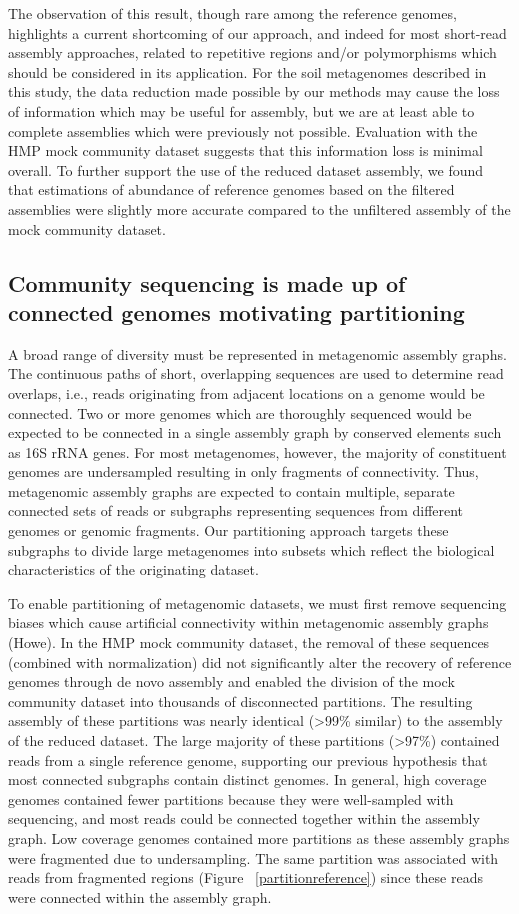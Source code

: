 \documentclass[11pt]{article} %
\begin{document}
The observation of this result, though rare among the reference genomes, highlights a current shortcoming of our approach, and indeed for most short-read assembly approaches, related to repetitive regions and/or polymorphisms which should be considered in its application.  For the soil metagenomes described in this study, the data reduction made possible by our methods may cause the loss of information which may be useful for assembly, but we are at least able to complete assemblies which were previously not possible.  Evaluation with the HMP mock community dataset suggests that this information loss is minimal overall.  To further support the use of the reduced dataset assembly, we found that estimations of abundance of reference genomes based on the filtered assemblies were slightly more accurate compared to the unfiltered assembly of the mock community dataset.

\subsection{Community sequencing is made up of connected genomes motivating partitioning}

A broad range of diversity must be represented in metagenomic assembly graphs. The continuous paths of short, overlapping sequences are used to determine read overlaps, i.e., reads originating from adjacent locations on a genome would be connected.   Two or more genomes which are thoroughly sequenced would be expected to be connected in a single assembly graph by conserved elements such as 16S rRNA genes.  For most metagenomes, however, the majority of constituent genomes are undersampled resulting in only fragments of connectivity.  Thus, metagenomic assembly graphs are expected to contain multiple, separate connected sets of reads or subgraphs representing sequences from different genomes or genomic fragments.  Our partitioning approach targets these subgraphs to divide large metagenomes into subsets which reflect the biological characteristics of the originating dataset.  

To enable partitioning of metagenomic datasets, we must first remove sequencing biases which cause artificial connectivity within metagenomic assembly graphs (Howe).  In the HMP mock community dataset, the removal of these sequences (combined with normalization) did not significantly alter the recovery of reference genomes through de novo assembly and enabled the division of the mock community dataset into thousands of disconnected partitions.  The resulting assembly of these partitions was nearly identical (>99\% similar) to the assembly of the reduced dataset.  The large majority of these partitions (>97\%) contained reads from a single reference genome, supporting our previous hypothesis that most connected subgraphs contain  distinct genomes.  In general, high coverage genomes contained fewer partitions because they were well-sampled with sequencing, and most reads could be connected together within the assembly graph.  Low coverage genomes contained more partitions as these assembly graphs were fragmented due to undersampling.  The same partition was associated with reads from fragmented regions (Figure ~\ref{partitionreference}) since these reads were connected within the assembly graph.  
\end{document}
